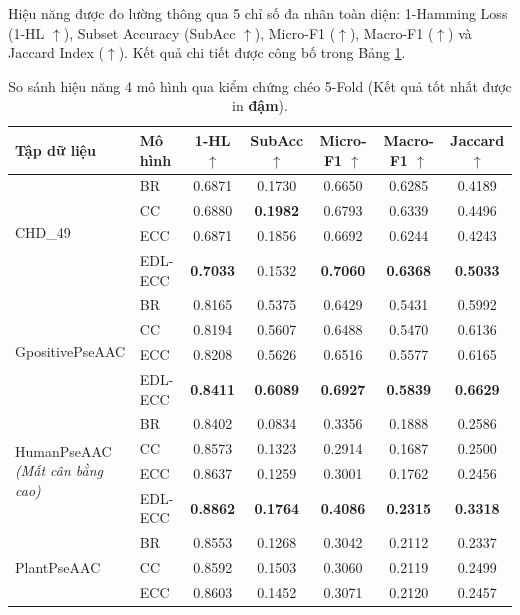 \documentclass[1p,times]{elsarticle}
\begin{document}
Hiệu năng được đo lường thông qua 5 chỉ số đa nhãn toàn diện: 1-Hamming Loss (1-HL $\uparrow$), Subset Accuracy (SubAcc $\uparrow$), Micro-F1 ($\uparrow$), Macro-F1 ($\uparrow$) và Jaccard Index ($\uparrow$). Kết quả chi tiết được công bố trong Bảng \ref{tab:full_benchmark_results}.

\begin{table}[H]
\centering
\caption{So sánh hiệu năng 4 mô hình qua kiểm chứng chéo 5-Fold (Kết quả tốt nhất được in \textbf{đậm}).}
\label{tab:full_benchmark_results}
\small
\begin{tabular*}{\textwidth}{@{\extracolsep{\fill}}llccccc}
\toprule
\textbf{Tập dữ liệu} & \textbf{Mô hình} & \textbf{1-HL} $\uparrow$ & \textbf{SubAcc} $\uparrow$ & \textbf{Micro-F1} $\uparrow$ & \textbf{Macro-F1} $\uparrow$ & \textbf{Jaccard} $\uparrow$ \\
\midrule
\multirow{4}{*}{CHD\_49} 
 & BR & 0.6871 & 0.1730 & 0.6650 & 0.6285 & 0.4189 \\
 & CC & 0.6880 & \textbf{0.1982} & 0.6793 & 0.6339 & 0.4496 \\
 & ECC & 0.6871 & 0.1856 & 0.6692 & 0.6244 & 0.4243 \\
 & EDL-ECC & \textbf{0.7033} & 0.1532 & \textbf{0.7060} & \textbf{0.6368} & \textbf{0.5033} \\
\midrule
\multirow{4}{*}{GpositivePseAAC} 
 & BR & 0.8165 & 0.5375 & 0.6429 & 0.5431 & 0.5992 \\
 & CC & 0.8194 & 0.5607 & 0.6488 & 0.5470 & 0.6136 \\
 & ECC & 0.8208 & 0.5626 & 0.6516 & 0.5577 & 0.6165 \\
 & EDL-ECC & \textbf{0.8411} & \textbf{0.6089} & \textbf{0.6927} & \textbf{0.5839} & \textbf{0.6629} \\
\midrule
\multirow{4}{*}{\parbox{2.8cm}{HumanPseAAC\\\textit{(Mất cân bằng cao)}}} 
 & BR & 0.8402 & 0.0834 & 0.3356 & 0.1888 & 0.2586 \\
 & CC & 0.8573 & 0.1323 & 0.2914 & 0.1687 & 0.2500 \\
 & ECC & 0.8637 & 0.1259 & 0.3001 & 0.1762 & 0.2456 \\
 & EDL-ECC & \textbf{0.8862} & \textbf{0.1764} & \textbf{0.4086} & \textbf{0.2315} & \textbf{0.3318} \\
\midrule
\multirow{4}{*}{PlantPseAAC} 
 & BR & 0.8553 & 0.1268 & 0.3042 & 0.2112 & 0.2337 \\
 & CC & 0.8592 & 0.1503 & 0.3060 & 0.2119 & 0.2499 \\
 & ECC & 0.8603 & 0.1452 & 0.3071 & 0.2120 & 0.2457 \\

\end{tabular*}
\end{table}
\end{document}
